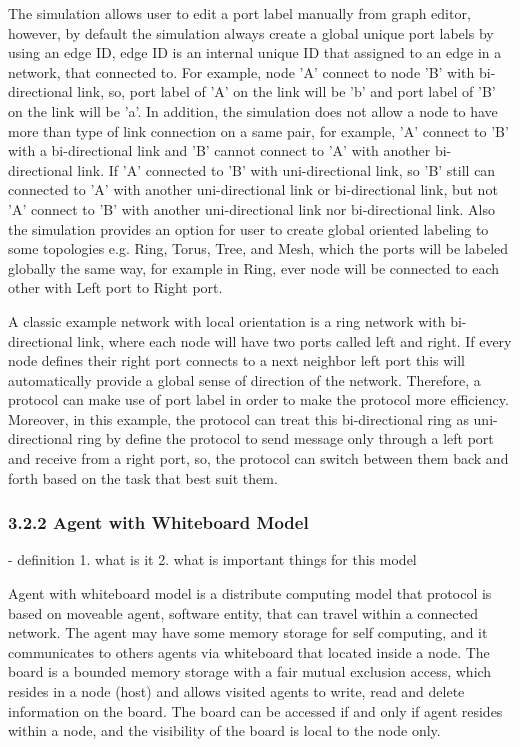 \begin{description}
The simulation allows user to edit a port label manually from graph editor, however, by default the simulation always create a global unique port labels by using an edge ID, edge ID is an internal unique ID that assigned to an edge in a network, that connected to. For example, node 'A' connect to node 'B' with bi-directional link, so, port label of 'A' on the link will be 'b' and port label of 'B' on the link will be 'a'. In addition, the simulation does not allow a node to have more than type of link connection on a same pair, for example, 'A' connect to 'B' with a bi-directional link and 'B' cannot connect to 'A' with another bi-directional link. If 'A' connected to 'B' with uni-directional link, so 'B' still can connected to 'A' with another uni-directional link or bi-directional link, but not 'A' connect to 'B' with another uni-directional link nor bi-directional link. Also the simulation provides an option for user to create global oriented labeling to some topologies e.g. Ring, Torus, Tree, and Mesh, which the ports will be labeled globally the same way, for example in Ring, ever node will be connected to each other with Left port to Right port.

A classic example network with local orientation is a ring network with bi-directional link, where each node will have two ports called left and right. If every node defines their right port connects to a next neighbor left port this will automatically provide a global sense of direction of the network. Therefore, a protocol can make use of port label in order to make the protocol more efficiency. Moreover, in this example, the protocol can treat this bi-directional ring as uni-directional ring by define the protocol to send message only through a left port and receive from a right port, so, the protocol can switch between them back and forth based on the task that best suit them.




\subsubsection{3.2.2 Agent with Whiteboard Model}

- definition
1. what is it
2. what is important things for this model

Agent with whiteboard model is a distribute computing model that protocol is based on moveable agent, software entity, that can travel within a connected network. The agent may have some memory storage for self computing, and it communicates to others agents via whiteboard that located inside a node. The board is a bounded memory storage with a fair mutual exclusion access, which resides in a node (host) and allows visited agents to write, read and delete information on the board. The board can be accessed if and only if agent resides within a node, and the visibility of the board is local to the node only.


\end{description}
